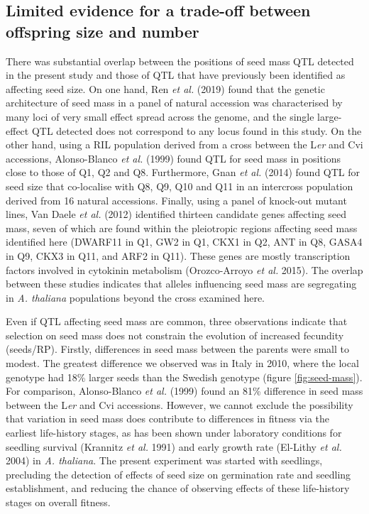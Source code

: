 \documentclass[]{article}
\begin{document}
\hypertarget{limited-evidence-for-a-trade-off-between-offspring-size-and-number}{%
\subsection{Limited evidence for a trade-off between offspring size and number}\label{limited-evidence-for-a-trade-off-between-offspring-size-and-number}}

There was substantial overlap between the positions of seed mass QTL detected in the present study and those of QTL that have previously been identified as affecting seed size. On one hand, Ren \emph{et al.} (2019) found that the genetic architecture of seed mass in a panel of natural accession was characterised by many loci of very small effect spread across the genome, and the single large-effect QTL detected does not correspond to any locus found in this study. On the other hand, using a RIL population derived from a cross between the L\emph{er} and Cvi accessions, Alonso-Blanco \emph{et al.} (1999) found QTL for seed mass in positions close to those of Q1, Q2 and Q8. Furthermore, Gnan \emph{et al.} (2014) found QTL for seed size that co-localise with Q8, Q9, Q10 and Q11 in an intercross population derived from 16 natural accessions. Finally, using a panel of knock-out mutant lines, Van Daele \emph{et al.} (2012) identified thirteen candidate genes affecting seed mass, seven of which are found within the pleiotropic regions affecting seed mass identified here (DWARF11 in Q1, GW2 in Q1, CKX1 in Q2, ANT in Q8, GASA4 in Q9, CKX3 in Q11, and ARF2 in Q11). These genes are mostly transcription factors involved in cytokinin metabolism (Orozco-Arroyo \emph{et al.} 2015). The overlap between these studies indicates that alleles influencing seed mass are segregating in \emph{A. thaliana} populations beyond the cross examined here.

Even if QTL affecting seed mass are common, three observations indicate that selection on seed mass does not constrain the evolution of increased fecundity (seeds/RP). Firstly, differences in seed mass between the parents were small to modest. The greatest difference we observed was in Italy in 2010, where the local genotype had 18\% larger seeds than the Swedish genotype (figure \ref{fig:seed-mass}). For comparison, Alonso-Blanco \emph{et al.} (1999) found an 81\% difference in seed mass between the L\emph{er} and Cvi accessions. However, we cannot exclude the possibility that variation in seed mass does contribute to differences in fitness via the earliest life-history stages, as has been shown under laboratory conditions for seedling survival (Krannitz \emph{et al.} 1991) and early growth rate (El-Lithy \emph{et al.} 2004) in \emph{A. thaliana}. The present experiment was started with seedlings, precluding the detection of effects of seed size on germination rate and seedling establishment, and reducing the chance of observing effects of these life-history stages on overall fitness.
\end{document}
